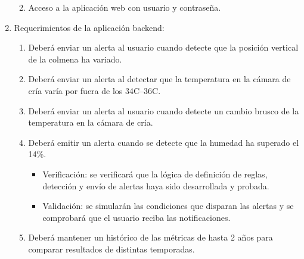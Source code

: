 \documentclass[
11pt, %
codirector, %
]{charter}
\begin{document}
\begin{enumerate}
\begin{enumerate}
\begin{itemize}
				\end{itemize}			
			\item Acceso a la aplicación web con usuario y contraseña.		
		\end{enumerate}
	\item Requerimientos de la aplicación backend:
		\begin{enumerate}
			\item Deberá enviar un alerta al usuario cuando detecte que la posición vertical de la colmena ha variado.		
			\item Deberá enviar un alerta al detectar que la temperatura en la cámara de cría varía por fuera de los 34\textdegree{}C--36\textdegree{}C.	
			\item Deberá enviar un alerta al usuario cuando detecte un cambio brusco de la temperatura en la cámara de cría.		
			\item Deberá emitir un alerta cuando se detecte que la humedad ha superado el 14\%.
				\begin{itemize}
					\item Verificación: se verificará que la lógica de definición de reglas, detección y envío de alertas haya sido desarrollada y probada.
					\item Validación: se simularán las condiciones que disparan las alertas y se comprobará que el usuario reciba las notificaciones.
				\end{itemize}			
			\item Deberá mantener un histórico de las métricas de hasta 2 años para comparar resultados de distintas temporadas.
	

\end{enumerate}
\end{enumerate}
\end{document}
